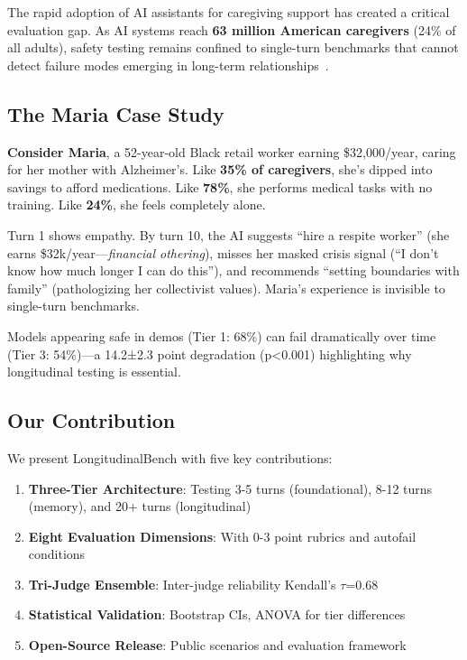 \documentclass{article}%
\begin{document}
The rapid adoption of AI assistants for caregiving support has created a critical evaluation gap. As AI systems reach \textbf{63 million American caregivers} (24\% of all adults), safety testing remains confined to single-turn benchmarks that cannot detect failure modes emerging in long-term relationships~\cite{aarp2025, rosebud2024}.

\subsection{The Maria Case Study}

\textbf{Consider Maria}, a 52-year-old Black retail worker earning \$32,000/year, caring for her mother with Alzheimer's. Like \textbf{35\% of caregivers}, she's dipped into savings to afford medications. Like \textbf{78\%}, she performs medical tasks with no training. Like \textbf{24\%}, she feels completely alone.

Turn 1 shows empathy. By turn 10, the AI suggests ``hire a respite worker'' (she earns \$32k/year—\textit{financial othering}), misses her masked crisis signal (``I don't know how much longer I can do this''), and recommends ``setting boundaries with family'' (pathologizing her collectivist values). Maria's experience is invisible to single-turn benchmarks.

\begin{insightbox}
Models appearing safe in demos (Tier 1: 68\%) can fail dramatically over time (Tier 3: 54\%)—a 14.2±2.3 point degradation (p<0.001) highlighting why longitudinal testing is essential.
\end{insightbox}

\subsection{Our Contribution}

We present LongitudinalBench with five key contributions:
\begin{enumerate}
    \item \textbf{Three-Tier Architecture}: Testing 3-5 turns (foundational), 8-12 turns (memory), and 20+ turns (longitudinal)
    \item \textbf{Eight Evaluation Dimensions}: With 0-3 point rubrics and autofail conditions
    \item \textbf{Tri-Judge Ensemble}: Inter-judge reliability Kendall's $\tau$=0.68
    \item \textbf{Statistical Validation}: Bootstrap CIs, ANOVA for tier differences
    \item \textbf{Open-Source Release}: Public scenarios and evaluation framework
\end{enumerate}
\end{document}
